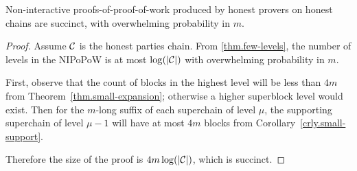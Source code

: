 \begin{theorem}
    Non-interactive proofs-of-proof-of-work produced by honest provers on
    honest chains are succinct, with overwhelming probability in $m$.
\end{theorem}
\begin{proof}
    Assume $\mathcal{C}$ is the honest parties chain. From \ref{thm.few-levels}, the
    number of levels in the NIPoPoW is at most $\log(|\mathcal{C}|)$ with
    overwhelming probability in $m$.

    First, observe that the count of blocks in the highest level will be less
    than $4m$ from Theorem~\ref{thm.small-expansion}; otherwise a higher
    superblock level would exist. Then for the $m$-long suffix of each
    superchain of level $\mu$, the supporting superchain of level $\mu - 1$
    will have at most $4m$ blocks from Corollary~\ref{crly.small-support}.

    Therefore the size of the proof is $4m \log(|\mathcal{C}|)$, which is succinct.
\end{proof}

%
%
%
